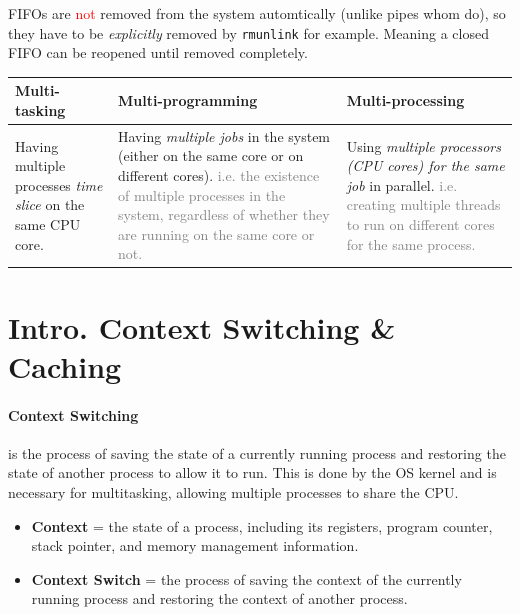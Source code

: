 \documentclass[openany,12pt]{book}
\newcommand{\code}[1]{\texttt{#1}}
\newcommand{\red}[1]{\textcolor{Red}{#1}}
\newcommand{\gray}[1]{\textcolor{gray}{#1}}
\begin{document}
FIFOs are \red{not} removed from the system automtically (unlike pipes whom do), so they have to be \textit{explicitly} removed by \code{rm}\code{unlink} for example. Meaning a closed FIFO can be reopened until removed completely.

\begin{samepage}
  \begin{center}
    \begin{tabular}{|>{\raggedright\arraybackslash}p{4cm}|
      >{\raggedright\arraybackslash}p{6cm}|
      >{\raggedright\arraybackslash}p{5cm}|}
      \hline
      \rowcolor{blue!30}
      \textbf{Multi-tasking} & \textbf{Multi-programming} & \textbf{Multi-processing} \\
      \hline
      Having multiple processes \textit{time slice} on the same CPU core.
                             &
      Having \textit{multiple jobs} in the system (either on the same core or on different cores). \gray{i.e. the existence of multiple processes in the system, regardless of whether they are running on the same core or not.}
                             &
      Using \textit{multiple processors (CPU cores) for the same job} in parallel. \gray{i.e. creating multiple threads to run on different cores for the same process.}
      \\
      \hline
    \end{tabular}
  \end{center}
\end{samepage}





\newpage
\section*{Intro. Context Switching \& Caching}
\paragraph{Context Switching} is the process of saving the state of a currently running process and restoring the state of another process to allow it to run. This is done by the OS kernel and is necessary for multitasking, allowing multiple processes to share the CPU.
\begin{itemize}
  \item \textbf{Context} = the state of a process, including its registers, program counter, stack pointer, and memory management information.
  \item \textbf{Context Switch} = the process of saving the context of the currently running process and restoring the context of another process.
\end{itemize}
\end{document}
